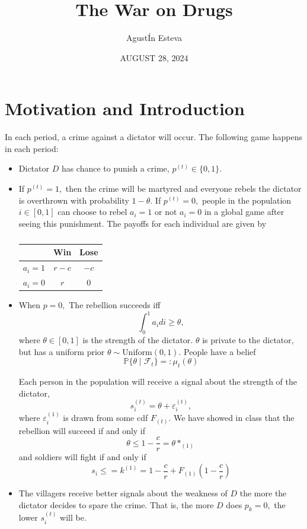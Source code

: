 \documentclass[openany, amssymb, psamsfonts]{amsart}
\title{The War on Drugs}
\author{AgustÍn Esteva}
\date{AUGUST 28, 2024}
\theoremstyle{definition}
\numberwithin{equation}{section}
\newcommand{\bbP}{\mathbb{P}}
\begin{document}
\begin{abstract}

\end{abstract}

\maketitle

\tableofcontents


\section{Motivation and Introduction}
In each period, a crime against a dictator will occur. The following game happens in each period:
\begin{itemize}
\item Dictator $D$ has chance to punish a crime, $p^{(t)} \in \{0,1\}.$ 
\item If $p^{(t)} = 1,$ then the crime will be martyred and everyone rebels the dictator is overthrown with probability $1-\theta.$ If $p^{(t)} = 0,$ people in the population $i \in [0,1]$ can choose to rebel $a_i = 1$ or not  $a_i = 0$ in a global game after seeing this punishment. The payoffs for each individual are given by  \begin{table}[H]
            \centering
        \begin{tabular}{c|c|c}
             & Win & Lose\\
             \hline
             $a_i = 1$ & $r -c$ & $-c$ \\
             \hline
             $a_i = 0$ &  $r$& $0$\\
        \end{tabular}
        \caption{}
    \end{table}

\item When $p = 0,$ The rebellion succeeds iff 
\[\int_0^1 a_i di \geq \theta,\] where $\theta \in [0,1]$ is the strength of the dictator. $\theta$ is private to the dictator, but has a uniform prior $\theta \sim \text{Uniform}(0,1).$
People have a belief
\[\bbP\{\theta \mid \mathcal{F}_t\} =:\mu_t(\theta)\]

Each person in the population will receive a signal about the strength of the dictator, 
\[s_i^{(t)} = \theta + \varepsilon_i^{(t)},\] where $\varepsilon_i^{(1)}$ is drawn from some cdf $F_{(t)}.$ We have showed in class that the rebellion will succeed if and only if 
\[\theta \leq 1 - \frac{c}{r} = \theta*_{(1)}\] and soldiers will fight if and only if 
\[s_i \leq = k^{(1)} = 1 - \frac{c}{r} + F_{(1)}(1 - \frac{c}{r})\]
\item The villagers receive better signals about the weakness of $D$ the more the dictator decides to spare the crime. That is, the more $D$ does $p_k = 0,$ the lower $s_i^{(t)}$ will be.
\end{itemize}
\end{document}

